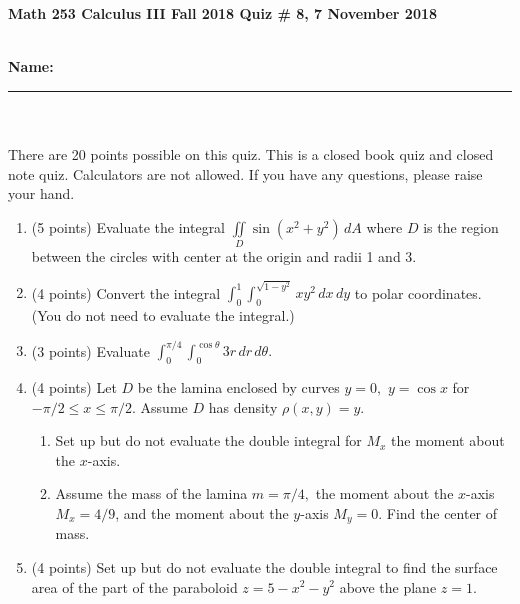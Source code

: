 \documentclass[11pt]{article}
\theoremstyle{remark}
\renewcommand{\d}{\displaystyle}
\begin{document}
{\bf Math 253 Calculus III Fall 2018 \hfill Quiz \# 8,  7 November 2018 }\\
\\
{\bf Name: \rule{3.5in}{1pt}}\\
\\
\noindent There are 20 points possible on this quiz. This is a closed
book quiz and closed note quiz. Calculators are not allowed. If you have any questions, please
raise your hand.

\begin{enumerate}
\item (5 points) Evaluate the integral $\iint\limits_D \sin(x^2+y^2) \, dA$ where $D$ is the region between the circles with center at the origin and radii 1 and 3.
\vfill
\item (4 points) Convert the integral $\d{\int_0^1 \int_0^{\sqrt{1-y^2}}xy^2 \, dx \,dy}$ to polar coordinates. (You do not need to evaluate the integral.)

\vfill
\newpage
\item (3 points) Evaluate $\int_0^{\pi/4} \int_0^{\cos{\theta}} 3r\, dr\, d\theta.$
\vfill
\item (4 points) Let $D$ be the lamina enclosed by curves $y=0,$ $y=\cos x$ for $-\pi/2 \leq x \leq \pi/2.$ Assume $D$ has density $\rho(x,y)=y.$
\begin{enumerate}
\item Set up but do not evaluate the double integral for $M_x$ the moment about the $x$-axis.
\vfill
\item Assume the mass of the lamina $m=\pi/4,$ the moment about the $x$-axis $M_x=4/9$, and the moment about the $y$-axis $M_y=0.$ Find the center of mass.
\vfill
\end{enumerate}
\item (4 points) Set up but do not evaluate the double integral  to find the surface area of the part of the paraboloid $z=5-x^2-y^2$ above the plane $z=1.$
\vfill
\end{enumerate}
\end{document}
